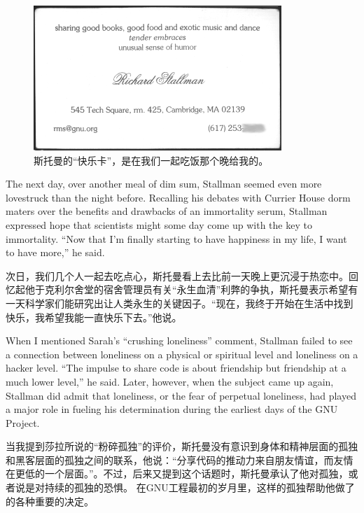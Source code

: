 \ifdefined\chs
\begin{figure}[ht] \centering
  \includegraphics[width=\textwidth]{pleasurecard}
  \caption{斯托曼的``快乐卡''，是在我们一起吃饭那个晚给我的。}
\end{figure}
\fi

\ifdefined\eng
The next day, over another meal of dim sum, Stallman seemed even more lovestruck than the night before. Recalling his debates with Currier House dorm maters over the benefits and drawbacks of an immortality serum, Stallman expressed hope that scientists might some day come up with the key to immortality. ``Now that I'm finally starting to have happiness in my life, I want to have more,'' he said.
\fi

\ifdefined\chs
次日，我们几个人一起去吃点心，斯托曼看上去比前一天晚上更沉浸于热恋中。回忆起他于克利尔舍堂的宿舍管理员有关``永生血清''利弊的争执，斯托曼表示希望有一天科学家们能研究出让人类永生的关键因子。``现在，我终于开始在生活中找到快乐，我希望我能一直快乐下去。''他说。
\fi

\ifdefined\eng
When I mentioned Sarah's ``crushing loneliness'' comment, Stallman failed to see a connection between loneliness on a physical or spiritual level and loneliness on a hacker level. ``The impulse to share code is about friendship but friendship at a much lower level,'' he said. Later, however, when the subject came up again, Stallman did admit that loneliness, or the fear of perpetual loneliness, %
had played a major role in fueling his determination during the earliest days of the GNU Project.
\fi

\ifdefined\chs
当我提到莎拉所说的``粉碎孤独''的评价，斯托曼没有意识到身体和精神层面的孤独和黑客层面的孤独之间的联系，他说：``分享代码的推动力来自朋友情谊，而友情在更低的一个层面。''。不过，后来又提到这个话题时，斯托曼承认了他对孤独，或者说是对持续的孤独的恐惧。%
在GNU工程最初的岁月里，这样的孤独帮助他做了的各种重要的决定。
\fi

